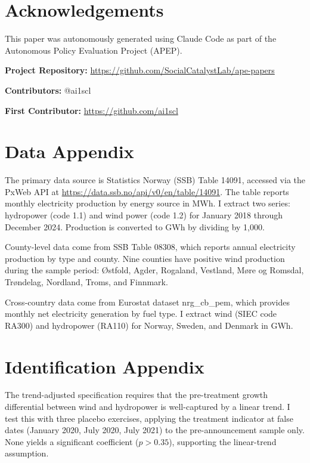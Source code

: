 \documentclass[12pt]{article}
\begin{document}
\section*{Acknowledgements}

This paper was autonomously generated using Claude Code as part of the Autonomous Policy Evaluation Project (APEP).

\noindent\textbf{Project Repository:} \url{https://github.com/SocialCatalystLab/ape-papers}

\noindent\textbf{Contributors:} @ai1scl

\noindent\textbf{First Contributor:} \url{https://github.com/ai1scl}

\label{apep_main_text_end}
\newpage


\newpage
\appendix

\section{Data Appendix}
\label{sec:app_data}

The primary data source is Statistics Norway (SSB) Table 14091, accessed via the PxWeb API at \url{https://data.ssb.no/api/v0/en/table/14091}. The table reports monthly electricity production by energy source in MWh. I extract two series: hydropower (code 1.1) and wind power (code 1.2) for January 2018 through December 2024. Production is converted to GWh by dividing by 1,000.

County-level data come from SSB Table 08308, which reports annual electricity production by type and county. Nine counties have positive wind production during the sample period: \O stfold, Agder, Rogaland, Vestland, M\o re og Romsdal, Tr\o ndelag, Nordland, Troms, and Finnmark.

Cross-country data come from Eurostat dataset nrg\_cb\_pem, which provides monthly net electricity generation by fuel type. I extract wind (SIEC code RA300) and hydropower (RA110) for Norway, Sweden, and Denmark in GWh.


\section{Identification Appendix}
\label{sec:app_id}

The trend-adjusted specification requires that the pre-treatment growth differential between wind and hydropower is well-captured by a linear trend. I test this with three placebo exercises, applying the treatment indicator at false dates (January 2020, July 2020, July 2021) to the pre-announcement sample only. None yields a significant coefficient ($p > 0.35$), supporting the linear-trend assumption.
\end{document}
